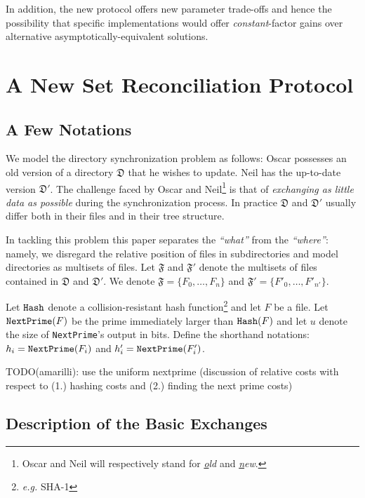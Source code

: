 \documentclass[11pt]{llncs}
\begin{document}
In addition, the new protocol offers new parameter trade-offs and hence the possibility that specific implementations would offer {\sl constant}-factor gains over alternative asymptotically-equivalent solutions.\smallskip

\section{A New Set Reconciliation Protocol}

\subsection{A Few Notations}

We model the directory synchronization problem as follows: Oscar possesses an old version of a directory $\mathfrak{D}$ that he wishes to update. Neil has the up-to-date version $\mathfrak{D}'$. The challenge faced by Oscar and Neil\footnote{Oscar and Neil will respectively stand for {\sl \underline{o}ld} and {\sl \underline{n}ew}.} is that of {\sl exchanging as little data as possible} during the synchronization process. In practice $\mathfrak{D}$ and $\mathfrak{D}'$ usually differ both in their files and in their tree structure.\smallskip

In tackling this problem this paper separates the {\sl ``what''} from the {\sl ``where''}: namely, we disregard the relative position of files in subdirectories and model directories as multisets of files. Let $\mathfrak{F}$ and $\mathfrak{F}'$ denote the multisets of files contained in $\mathfrak{D}$ and $\mathfrak{D}'$. We denote $\mathfrak{F}=\{F_0,\ldots,F_{n}\}$ and $\mathfrak{F}'=\{F'_0,\ldots,F'_{n'}\}$.\smallskip

Let $\mbox{{\tt Hash}}$ denote a collision-resistant hash function\footnote{{\sl e.g.} SHA-1} and let $F$ be a file. Let $\mbox{{\tt NextPrime}}(F)$ be the prime immediately larger than $\mbox{{\tt Hash}}(F)$ and let $u$ denote the size of {\tt NextPrime}'s output in bits. Define the shorthand notations: $h_i=\mbox{{\tt NextPrime}}(F_i)$ and $h'_i=\mbox{{\tt NextPrime}}(F'_i)$.\smallskip

TODO(amarilli): use the uniform nextprime (discussion of relative costs with respect to (1.) hashing costs and (2.) finding the next prime costs)

\subsection{Description of the Basic Exchanges}
\label{basic}
\end{document}
